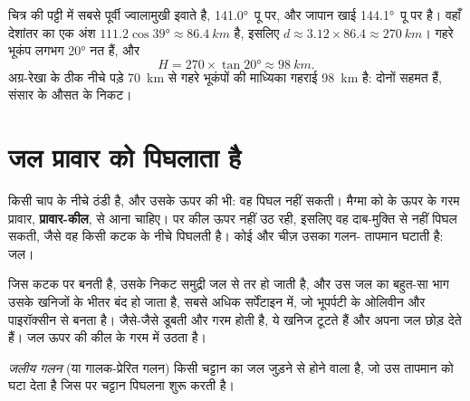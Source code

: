 \begin{example}[उत्तर-पूर्वी जापान]\label{ex:g12:subduction-magmatism:japan}
चित्र की पट्टी में सबसे पूर्वी ज्वालामुखी इवाते है, \ang{141.0}~पू पर,
और जापान खाई \ang{144.1}~पू पर है। वहाँ देशांतर का एक अंश
$111.2\cos\ang{39} \approx \qty{86.4}{km}$ है, इसलिए $d \approx 3.12 \times 86.4
\approx \qty{270}{km}$। गहरे भूकंप लगभग \ang{20} नत हैं, और
\[
  H = 270 \times \tan\ang{20} \approx \qty{98}{km}.
\]
अग्र-रेखा के ठीक नीचे पड़े \qty{70}{km} से गहरे भूकंपों की
माध्यिका गहराई \qty{98}{km} है: दोनों सहमत हैं, संसार के
औसत के निकट।
\end{example}

\section{जल प्रावार को पिघलाता है}

किसी चाप के नीचे  ठंडी है, और उसके ऊपर की  भी:
वह पिघल नहीं सकती। मैग्मा को  के ऊपर के गरम प्रावार,
\textbf{प्रावार-कील}, से आना चाहिए। पर कील ऊपर नहीं उठ रही, इसलिए वह
दाब-मुक्ति से नहीं पिघल सकती, जैसे वह किसी कटक के नीचे पिघलती है। कोई और चीज़ उसका गलन-
तापमान घटाती है: जल।

 जिस कटक पर बनती है, उसके निकट समुद्री जल से तर हो जाती है, और
उस जल का बहुत-सा भाग उसके खनिजों के भीतर बंद हो जाता है, सबसे अधिक
सर्पेंटाइन में, जो भूपर्पटी के ओलिवीन और पाइरॉक्सीन से बनता है। जैसे-जैसे 
डूबती और गरम होती है, ये खनिज टूटते हैं और अपना जल छोड़ देते हैं।
जल ऊपर की कील के गरम  में उठता है।

\begin{definition}[जलीय गलन]\label{def:g12:subduction-magmatism:hydrous-melting}
\emph{जलीय गलन} (या गालक-प्रेरित गलन) किसी चट्टान का
जल जुड़ने से होने वाला  है, जो उस
तापमान को घटा देता है जिस पर चट्टान पिघलना शुरू करती है।
\end{definition}

